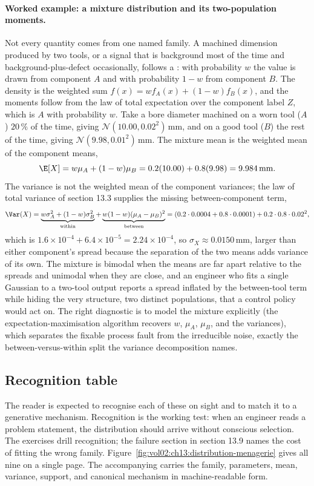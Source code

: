 \paragraph{Worked example: a mixture distribution and its two-population
moments.} Not every quantity comes from one named family. A machined
dimension produced by two tools, or a signal that is background most of
the time and background-plus-defect occasionally, follows a
: with probability $w$ the value is drawn from component
$A$ and with probability $1 - w$ from component $B$. The density is the
weighted sum $f(x) = w f_{A}(x) + (1 - w) f_{B}(x)$, and the moments
follow from the law of total expectation over the component label $Z$,
which is $A$ with probability $w$. Take a bore diameter machined on a
worn tool ($A$) $20\,\%$ of the time, giving $\mathcal{N}(10.00, 0.02^{2})
\,\text{mm}$, and on a good tool ($B$) the rest of the time, giving
$\mathcal{N}(9.98, 0.01^{2})\,\text{mm}$. The mixture mean is the
weighted mean of the component means,
\[
\E[X] = w\mu_{A} + (1 - w)\mu_{B}
= 0.2(10.00) + 0.8(9.98) = 9.984\,\text{mm}.
\]
The variance is not the weighted mean of the component variances; the law
of total variance of section 13.3 supplies the missing between-component
term,
\[
\Var(X) = \underbrace{w\sigma_{A}^{2} + (1 - w)\sigma_{B}^{2}}
_{\text{within}}
+ \underbrace{w(1 - w)(\mu_{A} - \mu_{B})^{2}}_{\text{between}}
= (0.2\cdot0.0004 + 0.8\cdot0.0001) + 0.2\cdot0.8\cdot0.02^{2},
\]
which is $1.6 \times 10^{-4} + 6.4 \times 10^{-5} = 2.24 \times 10^{-4}$,
so $\sigma_{X} \approx 0.0150\,\text{mm}$, larger than either component's
spread because the separation of the two means adds variance of its own.
The mixture is bimodal when the means are far apart relative to the
spreads and unimodal when they are close, and an engineer who fits a
single Gaussian to a two-tool output reports a spread inflated by the
between-tool term while hiding the very structure, two distinct
populations, that a control policy would act on. The right diagnostic is
to model the mixture explicitly (the expectation-maximisation algorithm
recovers $w$, $\mu_{A}$, $\mu_{B}$, and the variances), which separates
the fixable process fault from the irreducible noise, exactly the
between-versus-within split the variance decomposition names.

\subsection{Recognition table}

The reader is expected to recognise each of these on sight and to
match it to a generative mechanism. Recognition is the working test:
when an engineer reads a problem statement, the distribution should
arrive without conscious selection. The exercises drill recognition;
the failure section in section 13.9 names the cost of fitting the
wrong family. Figure~\ref{fig:vol02:ch13:distribution-menagerie}
gives all nine on a single page. The accompanying
carries the family, parameters, mean, variance, support, and
canonical mechanism in machine-readable form.

